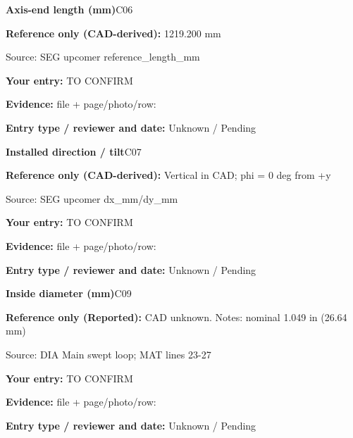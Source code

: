 \documentclass[11pt]{article}
\begin{document}
\par\noindent\begin{minipage}{\textwidth}\small
{\color{navy}\bfseries Axis-end length (mm)}\hfill C06\par
\colorbox{pale}{\parbox{\dimexpr\linewidth-2\fboxsep\relax}{
\textbf{Reference only (CAD-derived):} 1219.200 mm\par
{\footnotesize Source: SEG upcomer reference\_\allowbreak{}length\_\allowbreak{}mm}}}\par
\textbf{Your entry:} {\color{muted}TO CONFIRM}\enspace\hrulefill\par
{\footnotesize\textbf{Evidence:} file + page/photo/row: \hrulefill\par
\textbf{Entry type / reviewer and date:} Unknown / Pending\par
}\end{minipage}\par\vspace{5pt}
\par\noindent\begin{minipage}{\textwidth}\small
{\color{navy}\bfseries Installed direction / tilt}\hfill C07\par
\colorbox{pale}{\parbox{\dimexpr\linewidth-2\fboxsep\relax}{
\textbf{Reference only (CAD-derived):} Vertical in CAD; phi = 0 deg from +y\par
{\footnotesize Source: SEG upcomer dx\_\allowbreak{}mm/dy\_\allowbreak{}mm}}}\par
\textbf{Your entry:} {\color{muted}TO CONFIRM}\enspace\hrulefill\par
{\footnotesize\textbf{Evidence:} file + page/photo/row: \hrulefill\par
\textbf{Entry type / reviewer and date:} Unknown / Pending\par
}\end{minipage}\par\vspace{5pt}
\par\noindent\begin{minipage}{\textwidth}\small
{\color{navy}\bfseries Inside diameter (mm)}\hfill C09\par
\colorbox{pale}{\parbox{\dimexpr\linewidth-2\fboxsep\relax}{
\textbf{Reference only (Reported):} CAD unknown. Notes: nominal 1.049 in (26.64 mm)\par
{\footnotesize Source: DIA Main swept loop; MAT lines 23-27}}}\par
\textbf{Your entry:} {\color{muted}TO CONFIRM}\enspace\hrulefill\par
{\footnotesize\textbf{Evidence:} file + page/photo/row: \hrulefill\par
\textbf{Entry type / reviewer and date:} Unknown / Pending\par
}\end{minipage}\par\vspace{5pt}
\end{document}
